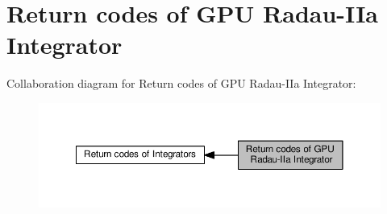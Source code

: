 \hypertarget{group__RKCU__ErrCodes}{}\section{Return codes of G\+PU Radau-\/\+I\+Ia Integrator}
\label{group__RKCU__ErrCodes}
Collaboration diagram for Return codes of G\+PU Radau-\/\+I\+Ia Integrator\+:\nopagebreak
\begin{figure}[H]
\begin{center}
\leavevmode
\includegraphics[width=350pt]{group__RKCU__ErrCodes}
\end{center}
\end{figure}
